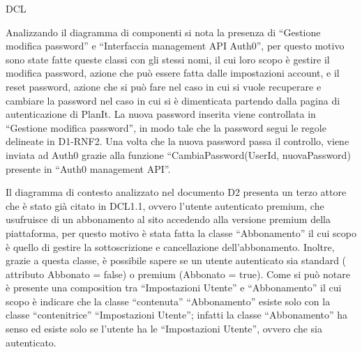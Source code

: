 \begin{listaPersonale}{DCL}
\begin{listaPersonale2}[DCL]{}
        Analizzando il diagramma di componenti si nota la presenza di “Gestione modifica password” e “Interfaccia management API Auth0”, per questo motivo sono state fatte queste classi con gli stessi nomi, il cui loro scopo è gestire il modifica password, azione che può essere fatta dalle impostazioni account, e il reset password, azione che si può fare nel caso in cui si vuole recuperare e cambiare la password nel caso in cui si è dimenticata partendo dalla pagina di autenticazione di PlanIt. La nuova password inserita viene controllata in “Gestione modifica password”, in modo tale che la password segui le regole delineate in D1-RNF2. Una volta che la nuova password passa il controllo, viene inviata ad Auth0 grazie alla funzione “CambiaPassword(UserId, nuovaPassword) presente in “Auth0 management API”.
        \begin{comment}
            \begin{center}
                \\
                \blfootnote{Immagine \href{https://github.com/Life-planner/Documentazione/blob/main/D3/img/Diagrammi/png/path/to/img.png}{PNG}/\href{https://github.com/Life-planner/Documentazione/blob/main/D3/img/Diagrammi/svg/path/to/img.svg}{SVG} nome file}
            \end{center}
        \end{comment}


        Il diagramma di contesto analizzato nel documento D2 presenta un terzo attore che è stato già citato in DCL1.1, ovvero l'utente autenticato premium, che usufruisce di un abbonamento al sito accedendo alla versione premium della piattaforma, per questo motivo è stata fatta la classe “Abbonamento” il cui scopo è quello di gestire la sottoscrizione e cancellazione dell'abbonamento. Inoltre, grazie a questa classe, è possibile sapere se un utente autenticato sia standard ( attributo Abbonato = false) o premium (Abbonato = true). Come si può notare è presente una composition tra “Impostazioni Utente” e “Abbonamento” il cui scopo è indicare che la classe “contenuta” “Abbonamento” esiste solo con la classe “contenitrice” “Impostazioni Utente”; infatti la classe “Abbonamento” ha senso ed esiste solo se l'utente ha le “Impostazioni Utente”, ovvero che sia autenticato.
        \begin{comment}
            \begin{center}
                \\
                \blfootnote{Immagine \href{https://github.com/Life-planner/Documentazione/blob/main/D3/img/Diagrammi/png/path/to/img.png}{PNG}/\href{https://github.com/Life-planner/Documentazione/blob/main/D3/img/Diagrammi/svg/path/to/img.svg}{SVG} nome file}
            \end{center}
        \end{comment}



\end{listaPersonale2}
\end{listaPersonale}
